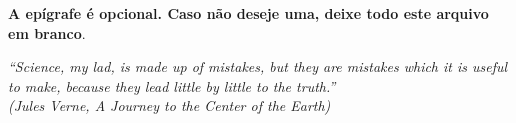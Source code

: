 \begin{epigrafe}
    \vspace*{\fill}
	\begin{flushright}
		\textbf{A epígrafe é opcional. Caso não deseje uma, deixe todo
		este arquivo em branco}.

		\textit{“Science, my lad, is made up of mistakes, but they are mistakes which it is useful to make, because they lead little by little to the truth.”\\
		(Jules Verne, A Journey to the Center of the Earth)}
	\end{flushright}
\end{epigrafe}
